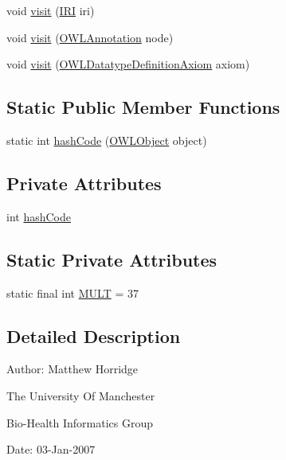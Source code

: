 \begin{DoxyCompactItemize}
\item 
void \hyperlink{classorg_1_1semanticweb_1_1owlapi_1_1util_1_1_hash_code_a87e3c901381c5b92f9cfa7c3f6271fa7}{visit} (\hyperlink{classorg_1_1semanticweb_1_1owlapi_1_1model_1_1_i_r_i}{I\-R\-I} iri)
\item 
void \hyperlink{classorg_1_1semanticweb_1_1owlapi_1_1util_1_1_hash_code_afa9283640b1dbd9c5c64b4c47179f30d}{visit} (\hyperlink{interfaceorg_1_1semanticweb_1_1owlapi_1_1model_1_1_o_w_l_annotation}{O\-W\-L\-Annotation} node)
\item 
void \hyperlink{classorg_1_1semanticweb_1_1owlapi_1_1util_1_1_hash_code_ae9ef0c26ce6b72cda9d63bc3213006c0}{visit} (\hyperlink{interfaceorg_1_1semanticweb_1_1owlapi_1_1model_1_1_o_w_l_datatype_definition_axiom}{O\-W\-L\-Datatype\-Definition\-Axiom} axiom)
\end{DoxyCompactItemize}
\subsection*{Static Public Member Functions}
\begin{DoxyCompactItemize}
\item 
static int \hyperlink{classorg_1_1semanticweb_1_1owlapi_1_1util_1_1_hash_code_ad78c4136423ce7d421741beb170f67d7}{hash\-Code} (\hyperlink{interfaceorg_1_1semanticweb_1_1owlapi_1_1model_1_1_o_w_l_object}{O\-W\-L\-Object} object)
\end{DoxyCompactItemize}
\subsection*{Private Attributes}
\begin{DoxyCompactItemize}
\item 
int \hyperlink{classorg_1_1semanticweb_1_1owlapi_1_1util_1_1_hash_code_aaf884b78388712a0777ced0a6ffa097e}{hash\-Code}
\end{DoxyCompactItemize}
\subsection*{Static Private Attributes}
\begin{DoxyCompactItemize}
\item 
static final int \hyperlink{classorg_1_1semanticweb_1_1owlapi_1_1util_1_1_hash_code_a4e9c6cee2e5a4b2e559f896f27b8e6bc}{M\-U\-L\-T} = 37
\end{DoxyCompactItemize}


\subsection{Detailed Description}
Author\-: Matthew Horridge\par
 The University Of Manchester\par
 Bio-\/\-Health Informatics Group\par
 Date\-: 03-\/\-Jan-\/2007\par
\par
 


